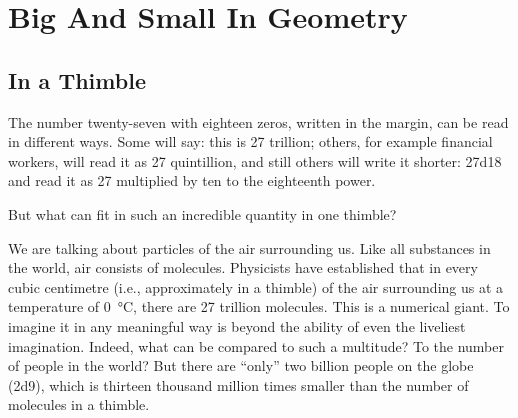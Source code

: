 



\chapter{Big And Small In Geometry}
\label{ch-11}



\section{In a Thimble}
\label{sec-11.1}

The number twenty-seven with eighteen zeros, written in the margin, can be read in different ways. Some will say: this is 27 trillion; others, for example financial workers, will read it as 27 quintillion, and still others will write it shorter: \num{27d18} and read it as 27 multiplied by ten to the eighteenth power.

But what can fit in such an incredible quantity in one thimble?

We are talking about particles of the air surrounding us. Like all substances in the world, air consists of molecules. Physicists have established that in every cubic centimetre (i.e., approximately in a thimble) of the air surrounding us at a temperature of \SI{0}{\degreeCelsius}, there are 27 trillion molecules. This is a numerical giant. To imagine it in any meaningful way is beyond the ability of even the liveliest imagination. Indeed, what can be compared to such a multitude? To the number of people in the world? But there are ``only'' two billion people on the globe (\num{2d9}), which is thirteen thousand million times smaller than the number of molecules in a thimble. 

